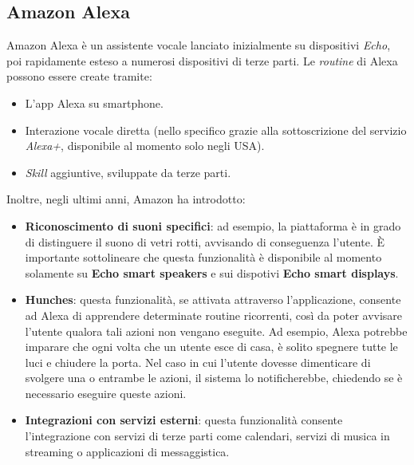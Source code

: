 

\subsection{Amazon Alexa}
Amazon Alexa è un assistente vocale lanciato inizialmente su dispositivi \emph{Echo}, poi rapidamente esteso a numerosi dispositivi di terze parti. Le \emph{routine} di Alexa possono essere create tramite:
\begin{itemize}
  \item L’app Alexa su smartphone.
  \item Interazione vocale diretta (nello specifico grazie alla sottoscrizione del servizio \textit{Alexa+}, disponibile al momento solo negli USA).
  \item \emph{Skill} aggiuntive, sviluppate da terze parti.
\end{itemize}

Inoltre, negli ultimi anni, Amazon ha introdotto:
\begin{itemize}
  \item \textbf{Riconoscimento di suoni specifici}: ad esempio, la piattaforma è in grado di distinguere il suono di vetri rotti, avvisando di conseguenza l'utente. È importante sottolineare che questa funzionalità è disponibile al momento solamente su \textbf{Echo smart speakers} e sui dispotivi \textbf{Echo smart displays}.\\
  
  \item \textbf{Hunches}: questa funzionalità, se attivata attraverso l’applicazione, consente ad Alexa di apprendere determinate routine ricorrenti, così da poter avvisare l’utente qualora tali azioni non vengano eseguite.
  Ad esempio, Alexa potrebbe imparare che ogni volta che un utente esce di casa, è solito spegnere tutte le luci e chiudere la porta. Nel caso in cui l'utente dovesse dimenticare di svolgere una o entrambe le azioni, il sistema lo notificherebbe, chiedendo se è necessario eseguire queste azioni.\\
  
  \item \textbf{Integrazioni con servizi esterni}: questa funzionalità consente l'integrazione con servizi di terze parti come calendari, servizi di musica in streaming o applicazioni di messaggistica.
\end{itemize}




